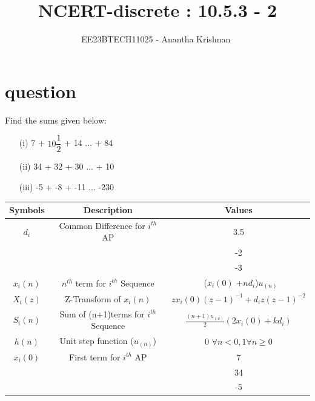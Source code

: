 \documentclass[journal,12pt,twocolumn]{IEEEtran}
\theoremstyle{remark}
\begin{document}

\vspace{3cm}

\title{NCERT-discrete : 10.5.3 - 2}
\author{EE23BTECH11025 - Anantha Krishnan $^{}$%
}
\maketitle
\newpage
\bigskip



\section{question}
\vspace{0.5cm}
Find the sums given below:
\begin{enumerate}
    \item[(i)] 7 + $10\dfrac{1}{2}$ + 14 ... + 84
    \item[(ii)] 34 + 32 + 30 ... + 10
    \item[(iii)] -5 + -8 + -11 ... -230

\end{enumerate}

 \vspace{1.5cm}
\begin{center}
\begin{enumerate}
\begin{tabular}{ |c|c|c| } 
 \hline
Symbols & Description & Values  \\
 \hline
$d_i$ & Common Difference for $i^{th}$ AP & 3.5 \\ \cline{3-3}
 & & -2 \\ \cline{3-3}
 & & -3 \\ 
\hline

  $x_i(n)$ & $n^{th}$ term for $i^{th}$ Sequence & \ ($x_i(0)$ +$nd_i$)$u_{(n)}$\\
  \hline

   $X_i(z)$ & Z-Transform of $x_i(n)$ & $zx_i(0)(z-1)^{-1}+d_iz(z-1)^{-2}$ \\
   \hline

   $S_i(n)$ & Sum of (n+1)terms for $i^{th}$ Sequence & $\frac{(n+1)u_{(u)}}{2}(2x_i(0) + kd_i)$\\
   \hline

  $h(n)$ & Unit step function ($u_{(n)}$) & 0 $\forall n<0 , 1 \forall n \geq 0$\\
  \hline

  $x_i(0)$ & First term for $i^{th}$ AP & 7 \\ \cline{3-3}
 & & 34 \\ \cline{3-3}
 & & -5 \\ 
\hline
  
   \hline
\end{tabular}
\end{enumerate}
\centering
\captionsetup{Table 1 : Parameters , Descriptions And Values }
\label{table:ee25-tab1}
\end{center} 
\end{document}
